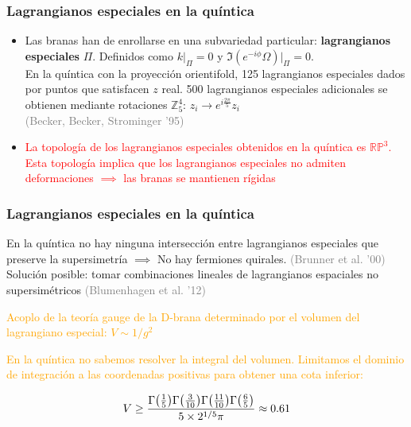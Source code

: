 \documentclass{beamer}
\begin{document}
\begin{frame}
  \frametitle{Lagrangianos especiales en la quíntica}
  \begin{itemize}
    \item Las branas han de enrollarse en una subvariedad particular: \textbf{lagrangianos especiales} $\Pi$.
     Definidos como $k|_\Pi=0$ y $\Im(e^{-i\phi}\Omega)|_\Pi=0$.\\
     En la quíntica con la proyección orientifold, 125 lagrangianos especiales dados por puntos que satisfacen $z$ real.
     500 lagrangianos especiales adicionales se obtienen mediante rotaciones $\mathbb Z_5^4$: $z_i \to e^{i\frac{2\pi}{5}}z_i$\\
     \textcolor{gray}{(Becker, Becker, Strominger '95)}
   \item \textcolor{red}{La topología de los lagrangianos especiales obtenidos en la quíntica es $\mathbb {RP}^3$.
      Esta topología implica que los lagrangianos especiales no admiten deformaciones $\implies$ las branas se mantienen rígidas}
  \end{itemize}
\end{frame}

\begin{frame}
  \frametitle{Lagrangianos especiales en la quíntica}
  \begin{itemize}
    \item \textcolor{ao}{En la quíntica no hay ninguna intersección entre lagrangianos especiales que preserve la supersimetría $\implies$ No
      hay fermiones quirales.}\textcolor{gray}{ (Brunner et al. '00)}\\
      \textcolor{ao}{Solución posible: tomar combinaciones lineales de lagrangianos espaciales no supersimétricos} \textcolor{gray}{(Blumenhagen et al. '12)}
      \textcolor{orange}{
      \item Acoplo de la teoría gauge de la D-brana determinado por el volumen del lagrangiano especial: $V \sim 1/g^2$
    \item En la quíntica no sabemos resolver la integral del volumen.
      Limitamos el dominio de integración a las coordenadas positivas para obtener una cota inferior:
    }
    \begin{equation*}
  V \geq\frac{\Gamma\qty(\frac{1}{5})\Gamma\qty(\frac{3}{10})\Gamma\qty(\frac{11}{10})\Gamma\qty(\frac{6}{5})}{5 \times 2^{1/5}\pi}\approx 0.61
    \end{equation*}
  \end{itemize}
\end{frame}
\end{document}
